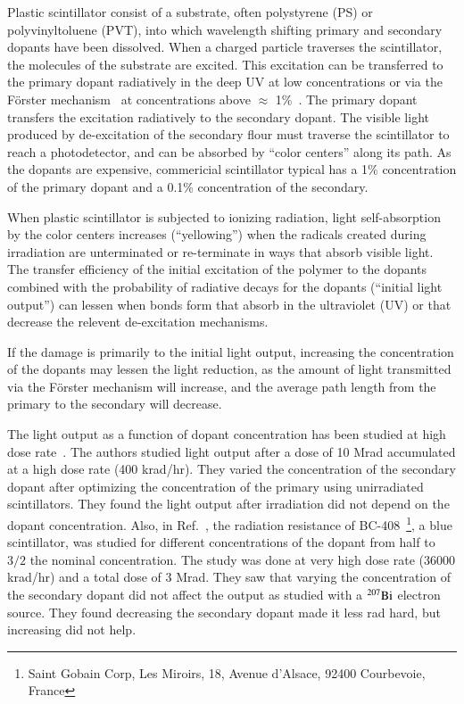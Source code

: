 \documentclass[review]{elsarticle}
\begin{document}
Plastic scintillator consist of a substrate, 
often polystyrene (PS) or polyvinyltoluene (PVT),
into which wavelength 
shifting primary and secondary dopants have been dissolved.
When a charged particle traverses the scintillator, the molecules of the substrate are excited.  
This excitation can be transferred to the primary dopant radiatively 
in the deep UV at low concentrations or 
via the F{\"o}rster mechanism~\cite{forster} at concentrations above $\approx$ 1\%~\cite{birks}.  
The primary dopant transfers the excitation radiatively to the secondary dopant.  
The visible light produced by de-excitation of the secondary flour
must traverse the scintillator to reach a photodetector, 
and can be absorbed by ``color centers'' along its path.
As the dopants are expensive, commericial scintillator typical has a 1\% concentration of the
primary dopant and a 0.1\% concentration of the secondary.

When plastic scintillator is subjected to ionizing radiation,
light self-absorption by the color centers  increases (``yellowing'') when the 
radicals created during irradiation are unterminated or 
re-terminate in ways that absorb visible light.
The transfer efficiency of the initial excitation of the polymer to the
dopants combined with the probability of 
radiative decays for the dopants (``initial light output'') can lessen
when bonds form that absorb in the ultraviolet (UV) or 
that decrease the relevent de-excitation mechanisms.

If the damage is primarily to the initial light output, increasing the concentration 
of the dopants may lessen the light reduction, as the amount of light transmitted
via the F{\"o}rster mechanism will increase, and the average path length from the primary to the
secondary will decrease.

The light output as a function of dopant concentration has been studied
at high dose rate~\cite{Bross199135}.  The authors studied light output
after a dose of 10 Mrad accumulated at a high dose rate (400 krad/hr).
They varied the concentration of the secondary dopant after optimizing the
concentration of the primary using unirradiated scintillators.  They found
the light output after irradiation did not depend on the dopant concentration.
Also, in Ref.~\cite{Majewski1989500}, the radiation resistance of 
BC-408~\footnote{Saint Gobain Corp, Les Miroirs, 18, Avenue d'Alsace, 92400 Courbevoie, France},
a blue scintillator,
was studied for different concentrations of the dopant from half to $3/2$ 
the nominal concentration.  The study was done at very high dose rate 
(36000 krad/hr) and a total dose of 3 Mrad.  
They saw that varying the concentration of the secondary dopant 
did not affect the output as studied with a $\rm{^{207}Bi}$ electron source.  
They found decreasing the secondary dopant made it less rad hard, but increasing did not help.  
\end{document}
